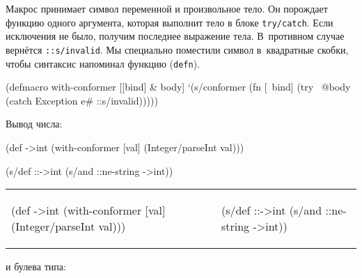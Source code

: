 Макрос принимает символ переменной и произвольное тело. Он порождает функцию
одного аргумента, которая выполнит тело в блоке \verb|try/catch|. Если
исключения не было, получим последнее выражение тела. В~противном случае
вернётся \verb|::s/invalid|. Мы специально поместили символ в~квадратные скобки,
чтобы синтаксис напоминал функцию (\verb|defn|).

\begin{english}
  \begin{clojure}
(defmacro with-conformer
  [[bind] & body]
  `(s/conformer
    (fn [~bind]
      (try
        ~@body
        (catch Exception e#
          ::s/invalid)))))
  \end{clojure}
\end{english}

\noindent

Вывод числа:

\ifx\DEVICETYPE\MOBILE

\begin{english}
  \begin{clojure}
(def ->int
  (with-conformer [val]
    (Integer/parseInt val)))
  \end{clojure}

\splitter

  \begin{clojure}
(s/def ::->int
  (s/and ::ne-string
         ->int))
  \end{clojure}
\end{english}

\else

\begin{english}

\noindent
\begin{tabular}{ @{}p{5cm} @{}p{5cm} }

  \begin{clojure}
(def ->int
  (with-conformer [val]
    (Integer/parseInt val)))
  \end{clojure}

&

  \begin{clojure}
(s/def ::->int
  (s/and ::ne-string
         ->int))
  \end{clojure}

\end{tabular}

\end{english}

\fi

\noindent
и булева типа:

